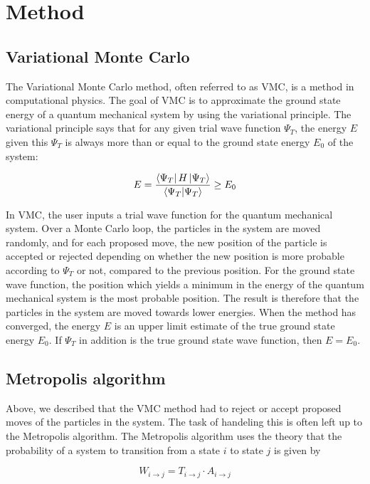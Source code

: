 \documentclass[norsk,a4paper,12pt]{article}
\begin{document}
\section{Method} \label{sec:Method}

\subsection{Variational Monte Carlo}
The Variational Monte Carlo method, often referred to as VMC, is a method in computational physics. The goal of VMC is to approximate the ground state energy of a quantum mechanical system by using the variational principle. The variational principle says that for any given trial wave function $\Psi_T$, the energy $E$ given this $\Psi_T$ is always more than or equal to the ground state energy $E_0$ of the system:

\begin{equation}
	\label{eq:variational_method}
	E = \frac{\bra{\Psi_T}H \ket{\Psi_T}}{\braket{\Psi_T}} \geq E_0
\end{equation} 

In VMC, the user inputs a trial wave function for the quantum mechanical system. Over a Monte Carlo loop, the particles in the system are moved randomly, and for each proposed move, the new position of the particle is accepted or rejected depending on whether the new position is more probable according to $\Psi_T$ or not, compared to the previous position. For the ground state wave function, the position which yields a minimum in the energy of the quantum mechanical system is the most probable position. The result is therefore that the particles in the system are moved towards lower energies. When the method has converged, the energy $E$ is an upper limit estimate of the true ground state energy $E_0$. If $\Psi_T$ in addition is the true ground state wave function, then $E=E_0$. 

\subsection{Metropolis algorithm}
Above, we described that the VMC method had to reject or accept proposed moves of the particles in the system. The task of handeling this is often left up to the Metropolis algorithm. The Metropolis algorithm uses the theory that the probability of a system to transition from a state $i$ to state $j$ is given by

\begin{equation}
W_{i\rightarrow j} = T_{i \rightarrow j}\cdot A_{i \rightarrow j}
\end{equation}
\end{document}
